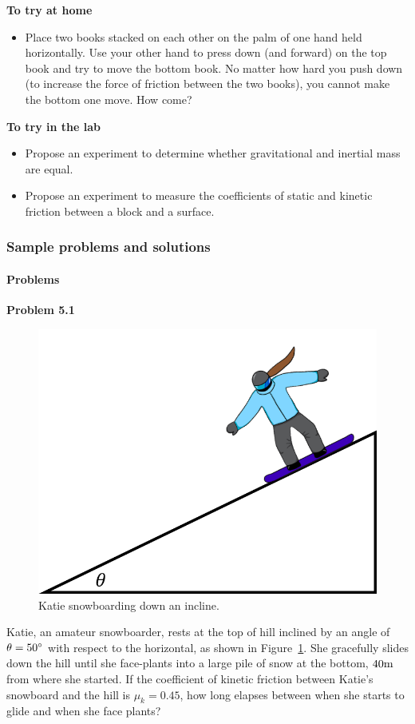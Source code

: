 \begin{framed}
\textbf{To try at home}\\
\begin{itemize}
\item Place two books stacked on each other on the palm of one hand held horizontally. Use your other hand to press down (and forward) on the top book and try to move the bottom book. No matter how hard you push down (to increase the force of friction between the two books), you cannot make the bottom one move. How come?
\end{itemize}
\end{framed}

\begin{framed}
\textbf{To try in the lab}\\
\begin{itemize}
\item Propose an experiment to determine whether gravitational and inertial mass are equal.
\item Propose an experiment to measure the coefficients of static and kinetic friction between a block and a surface.
\end{itemize}
\end{framed}

\subsubsection{Sample problems and solutions}

\paragraph{Problems}

\begin{framed}
\textbf{Problem 5.1}\\
\begin{figure}[!htbp]
\centering
\includegraphics[width=0.4\linewidth]{files/katiesnowboarding-aeca3e46b4630a1e2a156f4b7c0ef841.png}
\caption[]{Katie snowboarding down an incline.}
\label{fig:newtonslaws:katiesnowboarding}
\end{figure}

Katie, an amateur snowboarder, rests at the top of hill inclined by an angle of $\theta =50 {\rm \degree}$ with respect to the horizontal, as shown in Figure~\ref{fig:newtonslaws:katiesnowboarding}. She gracefully slides down the hill until she face-plants into a large pile of snow at the bottom, $40 {\rm m}$ from where she started. If the coefficient of kinetic friction between Katie's snowboard and the hill is $\mu_k=0.45$, how long elapses between when she starts to glide and when she face plants?
\end{framed}

